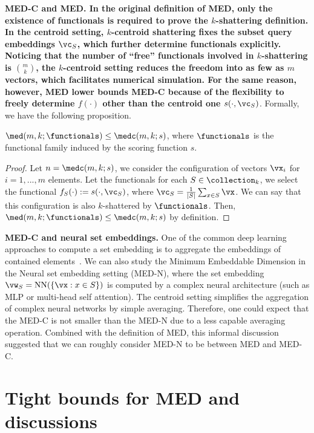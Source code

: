\textbf{MED-C and MED. In the original definition of MED, only the existence of functionals is required to prove the $k$-shattering definition. In the centroid setting, $k$-centroid shattering fixes the subset query embeddings $\vc_S$, which further determine functionals explicitly. Noticing that the number of ``free'' functionals involved in $k$-shattering is $\binom{m}{k}$, the $k$-centroid setting reduces the freedom into as few as $m$ vectors, which facilitates numerical simulation. For the same reason, however, MED lower bounds MED-C because of the flexibility to freely determine $f(\cdot)$ other than the centroid one $s(\cdot, \vc_S)$}. Formally, we have the following proposition.
\begin{proposition}
    $\med(m, k; \functionals) \leq \medc (m, k; s)$, where $\functionals$ is the functional family induced by the scoring function $s$.
\end{proposition}
\begin{proof}
    Let $n = \medc(m, k; s)$, we consider the configuration of vectors $\vx_i$ for $i=1,...,m$ elements. Let the functionals for each $S\in \collection_k$, we select the functional $f_S(\cdot) := s(\cdot, \vc_S)$, where $\vc_S =\frac{1}{|S|} \sum_{x \in S} \vx$. We can say that this configuration is also $k$-shattered by $\functionals$. Then, $\med(m, k; \functionals) \leq \medc(m,k;s)$ by definition.
\end{proof}

\textbf{MED-C and neural set embeddings.} One of the common deep learning approaches to compute a set embedding is to aggregate the embeddings of contained elements~\citep{zaheer2017deep}. We can also study the Minimum Embeddable Dimension in the Neural set embedding setting (MED-N), where the set embedding $\vw_S = {\rm NN}(\{\vx: x \in S\})$ is computed by a complex neural architecture (such as MLP or multi-head self attention). The centroid setting simplifies the aggregation of complex neural networks by simple averaging. Therefore, one could expect that the MED-C is not smaller than the MED-N due to a less capable averaging operation. Combined with the definition of MED, this informal discussion suggested that we can roughly consider MED-N to be between MED and MED-C.

\section{Tight bounds for MED and discussions}\label{sec:optimal-standard-theory}

